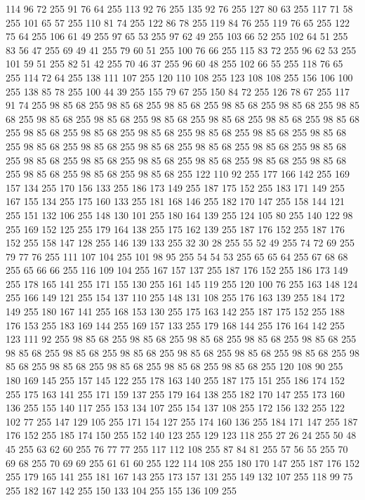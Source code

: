 114 96 72 255 91 76 64 255 113 92 76 255 135 92 76 255 127 80 63 255 117 71 58 255 101 65 57 255 110 81 74 255 122 86 78 255 119 84 76 255 119 76 65 255 122 75 64 255 106 61 49 255 97 65 53 255 97 62 49 255 103 66 52 255 102 64 51 255 83 56 47 255 69 49 41 255 79 60 51 255 100 76 66 255 115 83 72 255 96 62 53 255 101 59 51 255 82 51 42 255 70 46 37 255 96 60 48 255 102 66 55 255 118 76 65 255 114 72 64 255 138 111 107 255 120 110 108 255 123 108 108 255 156 106 100 255 138 85 78 255 100 44 39 255 155 79 67 255 150 84 72 255 126 78 67 255 117 91 74 255 98 85 68 255 98 85 68 255 98 85 68 255 98 85 68 255 98 85 68 255 98 85 68 255 98 85 68 255 98 85 68 255 98 85 68 255 98 85 68 255 98 85 68 255 98 85 68 255 98 85 68 255 98 85 68 255 98 85 68 255 98 85 68 255 98 85 68 255 98 85 68 255 98 85 68 255 98 85 68 255 98 85 68 255 98 85 68 255 98 85 68 255 98 85 68 255
98 85 68 255 98 85 68 255 98 85 68 255 98 85 68 255 98 85 68 255 98 85 68 255 98 85 68 255 98 85 68 255 98 85 68 255 122 110 92 255 177 166 142 255 169 157 134 255 170 156 133 255 186 173 149 255 187 175 152 255 183 171 149 255 167 155 134 255 175 160 133 255 181 168 146 255 182 170 147 255 158 144 121 255 151 132 106 255 148 130 101 255 180 164 139 255 124 105 80 255 140 122 98 255 169 152 125 255 179 164 138 255 175 162 139 255 187 176 152 255 187 176 152 255 158 147 128 255 146 139 133 255 32 30 28 255 55 52 49 255 74 72 69 255 79 77 76 255 111 107 104 255 101 98 95 255 54 54 53 255 65 65 64 255 67 68 68 255 65 66 66 255 116 109 104 255 167 157 137 255 187 176 152 255 186 173 149 255 178 165 141 255 171 155 130 255 161 145 119 255 120 100 76 255 163 148 124 255 166 149 121 255 154 137 110 255 148 131 108 255 176 163 139 255 184 172 149 255 180 167 141 255 168 153 130 255 175 163 142 255 187 175 152 255 188 176 153 255 183 169 144 255 169 157 133 255
179 168 144 255 176 164 142 255 123 111 92 255 98 85 68 255 98 85 68 255 98 85 68 255 98 85 68 255 98 85 68 255 98 85 68 255 98 85 68 255 98 85 68 255 98 85 68 255 98 85 68 255 98 85 68 255 98 85 68 255 98 85 68 255 98 85 68 255 98 85 68 255 98 85 68 255 120 108 90 255 180 169 145 255 157 145 122 255 178 163 140 255 187 175 151 255 186 174 152 255 175 163 141 255 171 159 137 255 179 164 138 255 182 170 147 255 173 160 136 255 155 140 117 255 153 134 107 255 154 137 108 255 172 156 132 255 122 102 77 255 147 129 105 255 171 154 127 255 174 160 136 255 184 171 147 255 187 176 152 255 185 174 150 255 152 140 123 255 129 123 118 255 27 26 24 255 50 48 45 255 63 62 60 255 76 77 77 255 117 112 108 255 87 84 81 255 57 56 55 255 70 69 68 255 70 69 69 255 61 61 60 255 122 114 108 255 180 170 147 255 187 176 152 255 179 165 141 255 181 167 143 255 173 157 131 255 149 132 107 255 118 99 75 255 182 167 142 255 150 133 104 255 155 136 109 255
